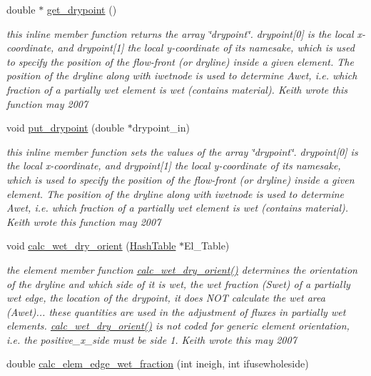 \begin{CompactItemize}
double $\ast$ \hyperlink{classElement_a127}{get\_\-drypoint} ()
\begin{CompactList}\small\item\em this inline member function returns the array \char`\"{}drypoint\char`\"{}. drypoint\mbox{[}0\mbox{]} is the local x-coordinate, and drypoint\mbox{[}1\mbox{]} the local y-coordinate of its namesake, which is used to specify the position of the flow-front (or dryline) inside a given element. The position of the dryline along with iwetnode is used to determine Awet, i.e. which fraction of a partially wet element is wet (contains material). Keith wrote this function may 2007 \item\end{CompactList}\item 
void \hyperlink{classElement_a128}{put\_\-drypoint} (double $\ast$drypoint\_\-in)
\begin{CompactList}\small\item\em this inline member function sets the values of the array \char`\"{}drypoint\char`\"{}. drypoint\mbox{[}0\mbox{]} is the local x-coordinate, and drypoint\mbox{[}1\mbox{]} the local y-coordinate of its namesake, which is used to specify the position of the flow-front (or dryline) inside a given element. The position of the dryline along with iwetnode is used to determine Awet, i.e. which fraction of a partially wet element is wet (contains material). Keith wrote this function may 2007 \item\end{CompactList}\item 
void \hyperlink{classElement_a129}{calc\_\-wet\_\-dry\_\-orient} (\hyperlink{classHashTable}{Hash\-Table} $\ast$El\_\-Table)
\begin{CompactList}\small\item\em the element member function \hyperlink{classElement_a129}{calc\_\-wet\_\-dry\_\-orient()} determines the orientation of the dryline and which side of it is wet, the wet fraction (Swet) of a partially wet edge, the location of the drypoint, it does NOT calculate the wet area (Awet)... these quantities are used in the adjustment of fluxes in partially wet elements. \hyperlink{classElement_a129}{calc\_\-wet\_\-dry\_\-orient()} is not coded for generic element orientation, i.e. the positive\_\-x\_\-side must be side 1. Keith wrote this may 2007 \item\end{CompactList}\item 
double \hyperlink{classElement_a130}{calc\_\-elem\_\-edge\_\-wet\_\-fraction} (int ineigh, int ifusewholeside)

\end{CompactItemize}
